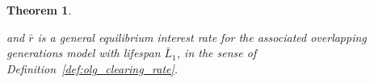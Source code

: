 \documentclass[10pt,a4paper]{amsart}
\theoremstyle{plain}
\newtheorem{thm}{Theorem}
\theoremstyle{plain}
\theoremstyle{definition}
\theoremstyle{remark}
\newcommand{\bw}{\mathbf{w}}
\newcommand{\mbR}{\mathbb{R}}
\newcommand{\mbW}{\mathbb{W}}
\newcommand{\red}[1]{#1}
\begin{document}
\begin{thm}
\begin{enumerate}[label=\roman*)]
     and $\bar{r}$ is a general equilibrium interest rate for the associated overlapping generations model with lifespan $\bar{L}_1$, in the sense of Definition~\ref{def:olg_clearing_rate}. \label{it:olg_well_posed_general}
 \end{enumerate}
\end{thm}
\end{document}
